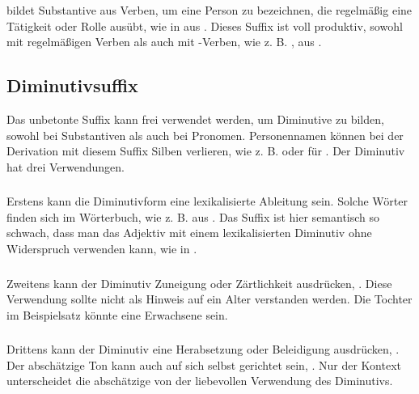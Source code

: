 \subsubsection{}  bildet Substantive aus Verben, um eine Person zu bezeichnen, die regelmäßig eine Tätigkeit oder Rolle ausübt, wie in   aus  . Dieses Suffix ist voll produktiv, sowohl mit regelmäßigen Verben als auch mit -Verben, wie z. B.  , aus  .

\subsection{Diminutivsuffix} Das unbetonte Suffix  kann frei verwendet werden, um Diminutive zu bilden, sowohl bei Substantiven als auch bei Pronomen. Personennamen können bei der Derivation mit diesem Suffix Silben verlieren, wie z. B.  oder  für . Der Diminutiv hat drei Verwendungen.
\label{lingop:dimin}

\subsubsection{} Erstens kann die Diminutivform eine lexikalisierte Ableitung sein. Solche Wörter finden sich im Wörterbuch, wie z. B.   aus  . Das Suffix ist hier semantisch so schwach, dass man das Adjektiv   mit einem lexikalisierten Diminutiv ohne Widerspruch verwenden kann, wie in  .

\subsubsection{} Zweitens kann der Diminutiv Zuneigung oder Zärtlichkeit ausdrücken,  . Diese Verwendung sollte nicht als Hinweis auf ein Alter verstanden werden. Die Tochter im Beispielsatz könnte eine Erwachsene sein.

\subsubsection{} Drittens kann der Diminutiv eine Herabsetzung oder Beleidigung ausdrücken,  . Der abschätzige Ton kann auch auf sich selbst gerichtet sein,  . Nur der Kontext unterscheidet die abschätzige von der liebevollen Verwendung des Diminutivs.

